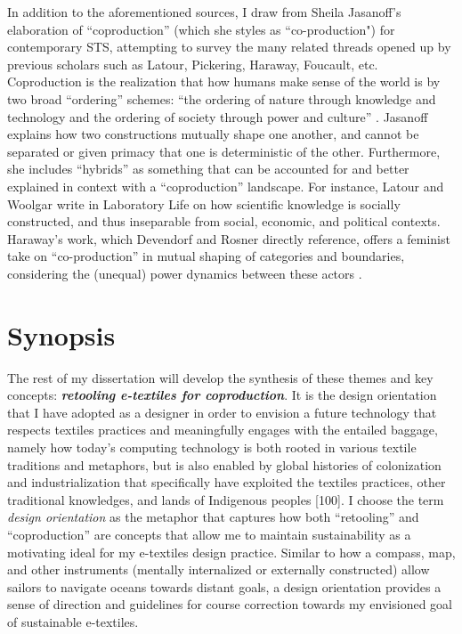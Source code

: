 In addition to the aforementioned sources, I draw from Sheila Jasanoff's elaboration of ``coproduction'' (which she styles as ``co-production") for contemporary STS, attempting to survey the many related threads opened up by previous scholars such as Latour, Pickering, Haraway, Foucault, etc. Coproduction is the realization that how humans make sense of the world is by two broad ``ordering'' schemes: ``the ordering of nature through knowledge and technology and the ordering of society through power and culture'' \cite{jasanoff_states_2010}. Jasanoff explains how two constructions mutually shape one another, and cannot be separated or given primacy that one is deterministic of the other. Furthermore, she includes ``hybrids'' as something that can be accounted for and better explained in context with a ``coproduction'' landscape. For instance, Latour and Woolgar write in Laboratory Life \cite{latour_laboratory_2013} on how scientific knowledge is socially constructed, and thus inseparable from social, economic, and political contexts. Haraway's work, which Devendorf and Rosner directly reference, offers a feminist take on ``co-production'' in mutual shaping of categories and boundaries, considering the (unequal) power dynamics between these actors \cite{haraway_staying_2016}.

\section{Synopsis}

The rest of my dissertation will develop the synthesis of these themes and key concepts: \textbf{\textit{retooling e-textiles for coproduction}}. It is the design orientation that I have adopted as a designer in order to envision a future technology that respects textiles practices and meaningfully engages with the entailed baggage, namely how today's computing technology is both rooted in various textile traditions and metaphors, but is also enabled by global histories of colonization and industrialization that specifically have exploited the textiles practices, other traditional knowledges, and lands of Indigenous peoples [100]. I choose the term \textit{design orientation} as the metaphor that captures how both ``retooling'' and ``coproduction'' are concepts that allow me to maintain sustainability as a motivating ideal for my e-textiles design practice. Similar to how a compass, map, and other instruments (mentally internalized or externally constructed) allow sailors to navigate oceans towards distant goals, a design orientation provides a sense of direction and guidelines for course correction towards my envisioned goal of sustainable e-textiles. 

